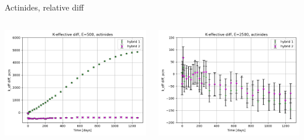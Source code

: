 \documentclass[
	11pt, %
	aspectratio=169, %
]{beamer}
\begin{document}
\begin{frame}{Actinides, relative diff}
\begin{columns}[c]
\begin{column}{0.39\textwidth}
			\includegraphics[width=\textwidth]{../figures/keff/keff_actinides_500_diff.png}
		\end{column}
		\begin{column}{0.39\textwidth}
			\includegraphics[width=\textwidth]{../figures/keff/keff_actinides_2500_diff.png}


\end{column}
\end{columns}
\end{frame}
\end{document}
